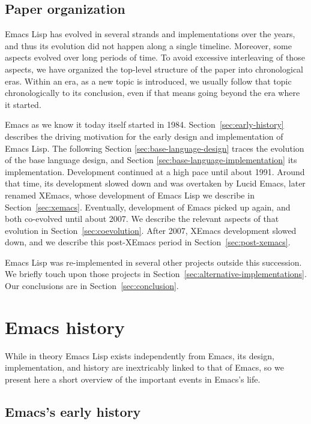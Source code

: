 \documentclass[format=acmsmall, review]{acmart}
\newcommand \Elisp {Emacs Lisp}
\begin{document}
\subsection{Paper organization}

\Elisp{} has evolved in several strands and implementations over the
years, and thus its evolution did not happen along a single timeline.
Moreover, some aspects evolved over long periods of time.  To avoid
excessive interleaving of those aspects, we have organized the
top-level structure of the paper into chronological eras.  Within an
era, as a new topic is introduced, we usually follow that topic
chronologically to its conclusion, even if that means going beyond the
era where it started.

Emacs as we know it today itself started in 1984.
Section~\ref{sec:early-history} describes the driving motivation for
the early design and implementation of \Elisp.  The following Section
\ref{sec:base-language-design} traces the evolution of the base
language design, and Section \ref{sec:base-language-implementation}
its implementation.
Development continued at a high pace until about 1991.
Around that time, its development slowed down and
was overtaken by Lucid Emacs, later renamed XEmacs, whose development of
\Elisp{} we describe in Section~\ref{sec:xemacs}.  Eventually,
development of Emacs picked up again, and both co-evolved until about
2007.  We describe the relevant aspects of that evolution in
Section~\ref{sec:coevolution}.  After 2007, XEmacs development slowed
down, and we describe this post-XEmacs period in
Section~\ref{sec:post-xemacs}.

\Elisp{} was re-implemented in several other projects outside this
succession.  We briefly touch upon those projects in
Section~\ref{sec:alternative-implementations}.  Our conclusions are in
Section~\ref{sec:conclusion}.

\section{Emacs history}
\label{sec:emacs-history}

While in theory \Elisp{} exists independently from Emacs, its design,
implementation, and history are inextricably linked to that of Emacs, so we
present here a short overview of the important events in Emacs's life.

\subsection{Emacs's early history}
\label{sec:emacs-early-history}
\end{document}
